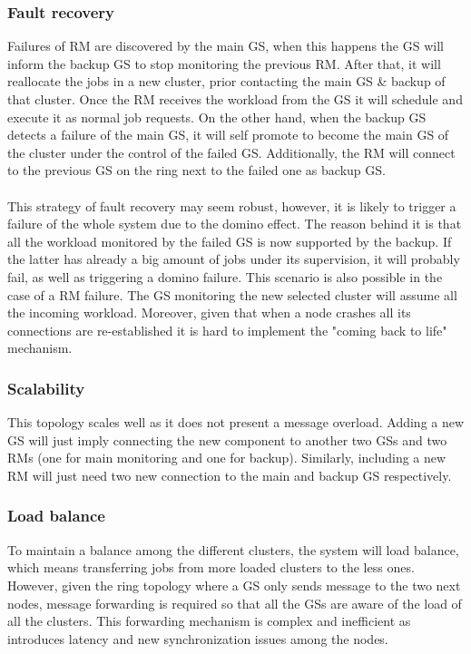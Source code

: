 \subsubsection{Fault recovery}
Failures of RM are discovered by the main GS, when this happens the GS will inform the backup GS to stop monitoring the previous RM. After that, it will reallocate the jobs in a new cluster, prior contacting the main GS & backup of that cluster. Once the RM receives the workload from the GS it will schedule and execute it as normal job requests.
On the other hand, when the backup GS detects a failure of the main GS, it will self promote to become the main GS of the cluster under the control of the failed GS. Additionally, the RM will connect to the previous GS on the ring next to the failed one as backup GS.
\\\\
This strategy of fault recovery may seem robust, however, it is likely to trigger a failure of the whole system due to the domino effect. The reason behind it is that all the workload monitored by the failed GS is now supported by the backup. If the latter has already a big amount of jobs under its supervision, it will probably fail, as well as triggering a domino failure. This scenario is also possible in the case of a RM failure. The GS monitoring the new selected cluster will assume all the incoming workload. Moreover, given that when a node crashes all its connections are re-established it is hard to implement the "coming back to life" mechanism.

\subsubsection{Scalability}
This topology scales well as it does not present a message overload. Adding a new GS will just imply connecting the new component to another two GSs and two RMs (one for main monitoring and one for backup). Similarly, including a new RM will just need two new connection to the main and backup GS respectively.

\subsubsection{Load balance}
To maintain a balance among the different clusters, the system will load balance, which means transferring jobs from more loaded clusters to the less ones. However, given the ring topology where a GS only sends message to the two next nodes, message forwarding is required so that all the GSs are aware of the load of all the clusters. This forwarding mechanism is complex and inefficient as introduces latency and new synchronization issues among the nodes.

